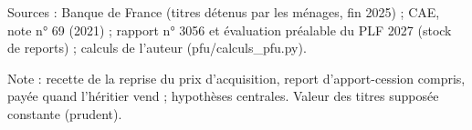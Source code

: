 Sources : Banque de France (titres détenus par les ménages, fin 2025) ; CAE, note n° 69 (2021) ; rapport n° 3056 et évaluation préalable du PLF 2027 (stock de reports) ; calculs de l'auteur (pfu/calculs\_pfu.py).\par Note : recette de la reprise du prix d'acquisition, report d'apport-cession compris, payée quand l'héritier vend ; hypothèses centrales. Valeur des titres supposée constante (prudent).
